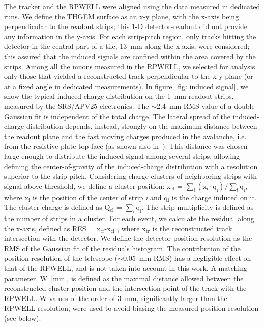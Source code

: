 The tracker and the RPWELL were aligned using the data measured in dedicated runs. We define the THGEM surface as an x-y plane, with the x-axis being perpendicular to the readout strips; this 1-D detector-readout did not provide any information in the y-axis.  For each strip-pitch region, only tracks hitting the detector in the central part of a tile, 13~mm along the x-axis, were considered; this assured that the induced signals are confined within the area covered by the strips.
Among all the muons measured in the RPWELL, we selected for analysis only those that yielded a reconstructed track perpendicular to the x-y plane (or at a fixed angle in dedicated measurements). 
In figure~\ref{fig: induced signal}, we show the typical induced-charge distribution on the 1~mm readout strips, measured by the SRS/APV25 electronics. The $\sim$2.4~mm RMS value of a double-Gaussian fit is independent of the total charge. The lateral spread of the induced-charge distribution depends, instead, strongly on the maximum distance between the readout plane and the fast moving charges produced in the avalanche, i.e. from the resistive-plate top face (as shown also in~\cite{cortesi2007investigations}). This distance was chosen large enough to distribute the induced signal among several strips, allowing defining the center-of-gravity of the induced-charge distribution with a resolution superior to the strip pitch. Considering charge clusters of neighboring strips with signal above threshold, we define a cluster position: x$\mathrm{_{cl}}$ = $\mathrm{\sum_i(x_i\cdot q_i)/\sum_iq_i}$, where x$\mathrm{_i}$  is the position of the center of strip \textit{i} and q$\mathrm{_i}$ is the charge induced on it. The cluster charge is defined as Q$\mathrm{_{cl}}$ = $\mathrm{\sum_iq_i}$. The strip multiplicity is defined as the number of strips in a cluster.  For each event, we calculate the residual along the x-axis, defined as RES = x$\mathrm{_{tr}}$-x$\mathrm{_{cl}}$ , where x$\mathrm{_{tr}}$ is the reconstructed track intersection with the detector. We define the detector position resolution as the RMS of the Gaussian fit of the residuals histogram. The contribution of the position resolution of the telescope ($\sim$0.05~mm RMS) has a negligible effect on that of the RPWELL, and is not taken into account in this work. A matching parameter, W~[mm], is defined as the maximal distance allowed between the reconstructed cluster position and the intersection point of the track with the RPWELL. W-values of the order of 3~mm, significantly larger than the RPWELL resolution, were used to avoid biasing the measured position resolution (see below).
